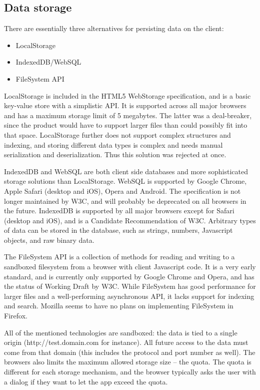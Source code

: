 \subsection{Data storage}

There are essentially three alternatives for persisting data on the client:

\begin{itemize}
\item LocalStorage
\item IndexedDB/WebSQL
\item FileSystem API
\end{itemize}

LocalStorage is included in the HTML5 WebStorage specification, and is a basic key-value store with a simplistic API. It is supported across all major browsers and has a maximum storage limit of 5 megabytes. The latter was a deal-breaker, since the product would have to support larger files than could possibly fit into that space. LocalStorage further does not support complex structures and indexing, and storing different data types is complex and needs manual serialization and deserialization. Thus this solution was rejected at once.

IndexedDB and WebSQL are both client side databases and more sophisticated storage solutions than LocalStorage. WebSQL is supported by Google Chrome, Apple Safari (desktop and iOS), Opera and Android. The specification is not longer maintained by W3C, and will probably be deprecated on all browsers in the future. IndexedDB is supported by all major browsers except for Safari (desktop and iOS), and is a Candidate Recommendation of W3C. Arbitrary types of data can be stored in the database, such as strings, numbers, Javascript objects, and raw binary data.

The FileSystem API is a collection of methods for reading and writing to a sandboxed filesystem from a browser with client Javascript code. It is a very early standard, and is currently only supported by Google Chrome and Opera, and has the status of Working Draft by W3C. While FileSystem has good performance for larger files and a well-performing asynchronous API, it lacks support for indexing and search. Mozilla seems to have no plans on implementing FileSystem in Firefox.

All of the mentioned technologies are sandboxed: the data is tied to a single origin (http://test.domain.com for instance). All future access to the data must come from that domain (this includes the protocol and port number as well). The browsers also limits the maximum allowed storage size – the quota. The quota is different for each storage mechanism, and the browser typically asks the user with a dialog if they want to let the app exceed the quota.

